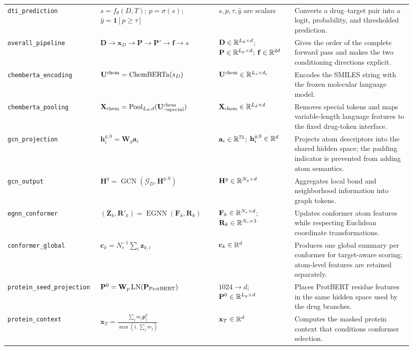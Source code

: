 \begin{longtable}{>{\RaggedRight\arraybackslash}p{0.20\linewidth}>{\RaggedRight\arraybackslash}p{0.28\linewidth}>{\RaggedRight\arraybackslash}p{0.18\linewidth}>{\RaggedRight\arraybackslash}p{0.28\linewidth}}
\texttt{dti\_prediction} & $s=f_\theta(D,T)$; $p=\sigma(s)$; $\hat y=\mathbf{1}[p\ge\tau]$ & $s,p,\tau,\hat y$ are scalars & Converts a drug--target pair into a logit, probability, and thresholded prediction. \\
\texttt{overall\_pipeline} & $\mathbf D\to\mathbf x_D\to\mathbf P\to\mathbf P'\to\mathbf f\to s$ & $\mathbf D\in\mathbb{R}^{L_d\times d}$; $\mathbf P\in\mathbb{R}^{L_p\times d}$; $\mathbf f\in\mathbb{R}^{2d}$ & Gives the order of the complete forward pass and makes the two conditioning directions explicit. \\
\texttt{chemberta\_encoding} & $\mathbf U^{\rm chem}=\operatorname{ChemBERTa}(s_D)$ & $\mathbf U^{\rm chem}\in\mathbb{R}^{L_s\times d_c}$ & Encodes the SMILES string with the frozen molecular language model. \\
\texttt{chemberta\_pooling} & $\mathbf X_{\rm chem}=\operatorname{Pool}_{L_d,d}(\mathbf U^{\rm chem}_{\neg\rm special})$ & $\mathbf X_{\rm chem}\in\mathbb{R}^{L_d\times d}$ & Removes special tokens and maps variable-length language features to the fixed drug-token interface. \\
\texttt{gcn\_projection} & $\mathbf h_i^{g,0}=\mathbf W_g\mathbf a_i$ & $\mathbf a_i\in\mathbb{R}^{75}$; $\mathbf h_i^{g,0}\in\mathbb{R}^d$ & Projects atom descriptors into the shared hidden space; the padding indicator is prevented from adding atom semantics. \\
\texttt{gcn\_output} & $\mathbf H^g=\operatorname{GCN}(\mathcal G_D,\mathbf H^{g,0})$ & $\mathbf H^g\in\mathbb{R}^{N_g\times d}$ & Aggregates local bond and neighborhood information into graph tokens. \\
\texttt{egnn\_conformer} & $(\mathbf Z_k,\mathbf R'_k)=\operatorname{EGNN}(\mathbf F_k,\mathbf R_k)$ & $\mathbf F_k\in\mathbb{R}^{N_c\times d}$; $\mathbf R_k\in\mathbb{R}^{N_c\times3}$ & Updates conformer atom features while respecting Euclidean coordinate transformations. \\
\texttt{conformer\_global} & $\mathbf c_k=N_c^{-1}\sum_i\mathbf z_{k,i}$ & $\mathbf c_k\in\mathbb{R}^d$ & Produces one global summary per conformer for target-aware scoring; atom-level features are retained separately. \\
\texttt{protein\_seed\_projection} & $\mathbf P^0=\mathbf W_p\operatorname{LN}(\mathbf P_{\rm ProtBERT})$ & $1024\to d$; $\mathbf P^0\in\mathbb{R}^{L_p\times d}$ & Places ProtBERT residue features in the same hidden space used by the drug branches. \\
\texttt{protein\_context} & $\mathbf x_T=\frac{\sum_jm_j\mathbf p^0_j}{\max(1,\sum_jm_j)}$ & $\mathbf x_T\in\mathbb{R}^d$ & Computes the masked protein context that conditions conformer selection. \\

\end{longtable}
